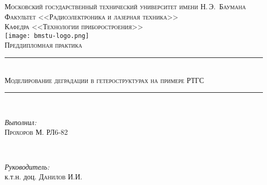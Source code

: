 \newcommand{\HRule}{\rule{\linewidth}{.5mm}\\}

\begin{center}

\textsc{\large Московский государственный технический университет имени Н.\,Э.~Баумана}\\[5mm]
\textsc{Факультет <<Радиоэлектроника и лазерная техника>>}\\
\textsc{Кафедра <<Технологии приборостроения>>}\\[2.5mm]

\texttt{[image: bmstu-logo.png]}\\[0.5cm]

\textsc{\large Преддипломная практика}\\

\HRule[0.5cm]
{\huge \textsc{Моделирование деградации в гетероструктурах на примере РТГС}}
\HRule[3cm]


        \begin{minipage}{0.4\textwidth}
            \begin{flushleft} \large
                \emph{Выполнил:}\\
                \textsc{Прохоров} М. РЛ6-82
            \end{flushleft}
        \end{minipage}
        ~
        \begin{minipage}{0.5\textwidth}
            \begin{flushright} \large
                \emph{Руководитель:} \\
               к.т.н. доц. \textsc{Данилов} И.И. 
            \end{flushright}
        \end{minipage}\\[1cm]


\vfill




\end{center}

\newpage
{}



